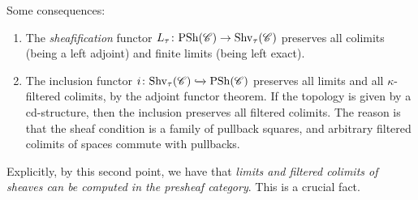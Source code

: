\documentclass[11pt,openany]{book}
\renewcommand{\Pre}{\mathrm{PSh}}
\begin{document}
\begin{corollary}\label{cor:properties-sheafification} 
Some consequences:
\begin{enumerate}
    \item The \textit{sheafification} functor $L_\tau \colon \Pre(\mathscr{C}) \to \Shv_\tau(\mathscr{C})$ preserves all colimits (being a left adjoint) and finite limits (being left exact).

    \item The inclusion functor $i \colon \Shv_\tau(\mathscr{C}) \hookto \Pre(\mathscr{C})$ preserves all limits and all $\kappa$-filtered colimits, by the adjoint functor theorem. If the topology is given by a cd-structure, then the inclusion preserves all filtered colimits. The reason is that the sheaf condition is a family of pullback squares, and arbitrary filtered colimits of spaces commute with pullbacks.
\end{enumerate}
\end{corollary}

Explicitly, by this second point, we have that \textit{limits and filtered colimits of sheaves can be computed in the presheaf category}. This is a crucial fact.
\end{document}
